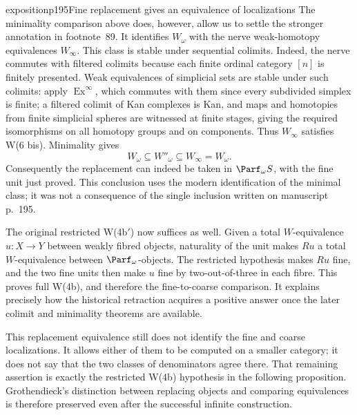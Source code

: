 \begin{dcomment}{exposition}{p195}{Fine replacement gives an equivalence of localizations}
The minimality comparison above does, however, allow us to settle the stronger annotation in footnote~89. It identifies $W_\omega$ with the nerve weak-homotopy equivalences $W_\infty$. This class is stable under sequential colimits. Indeed, the nerve commutes with filtered colimits because each finite ordinal category $[n]$ is finitely presented. Weak equivalences of simplicial sets are stable under such colimits: apply $\operatorname{Ex}^{\infty}$, which commutes with them since every subdivided simplex is finite; a filtered colimit of Kan complexes is Kan, and maps and homotopies from finite simplicial spheres are witnessed at finite stages, giving the required isomorphisms on all homotopy groups and on components. Thus $W_\infty$ satisfies W(6 bis). Minimality gives
\[
 W_\omega\subseteq W''_\omega\subseteq W_\infty=W_\omega.
\]
Consequently the replacement can indeed be taken in $\Parf_\omega S$, with the fine unit just proved. This conclusion uses the modern identification of the minimal class; it was not a consequence of the single inclusion written on manuscript p.~195.

The original restricted W(4b$'$) now suffices as well. Given a total $W$-equivalence $u:X\to Y$ between weakly fibred objects, naturality of the unit makes $Ru$ a total $W$-equivalence between $\Parf_\omega$-objects. The restricted hypothesis makes $Ru$ fine, and the two fine units then make $u$ fine by two-out-of-three in each fibre. This proves full W(4b), and therefore the fine-to-coarse comparison. It explains precisely how the historical retraction acquires a positive answer once the later colimit and minimality theorems are available.

This replacement equivalence still does not identify the fine and coarse localizations. It allows either of them to be computed on a smaller category; it does not say that the two classes of denominators agree there. That remaining assertion is exactly the restricted W(4b) hypothesis in the following proposition. Grothendieck's distinction between replacing objects and comparing equivalences is therefore preserved even after the successful infinite construction.
\end{dcomment}

